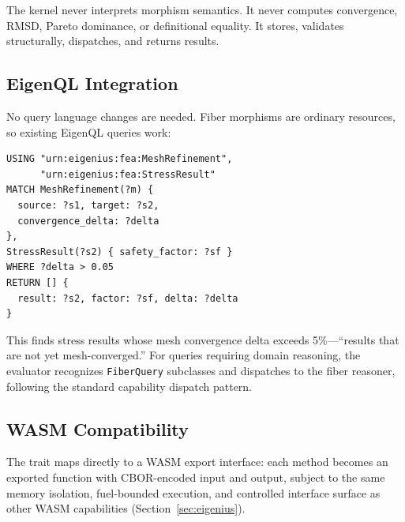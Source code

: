 \documentclass[10pt,twocolumn,letterpaper]{article}
\newcommand{\code}[1]{\texttt{\small #1}}
\begin{document}
The kernel never interprets morphism semantics.
It never computes convergence, RMSD, Pareto dominance, or definitional equality.
It stores, validates structurally, dispatches, and returns results.

\subsection{EigenQL Integration}

No query language changes are needed.
Fiber morphisms are ordinary resources, so existing EigenQL queries work:

{\scriptsize
\begin{verbatim}
USING "urn:eigenius:fea:MeshRefinement",
      "urn:eigenius:fea:StressResult"
MATCH MeshRefinement(?m) {
  source: ?s1, target: ?s2,
  convergence_delta: ?delta
},
StressResult(?s2) { safety_factor: ?sf }
WHERE ?delta > 0.05
RETURN [] {
  result: ?s2, factor: ?sf, delta: ?delta
}
\end{verbatim}
}

\noindent This finds stress results whose mesh convergence delta exceeds 5\%---``results that are not yet mesh-converged.''
For queries requiring domain reasoning, the evaluator recognizes \code{FiberQuery} subclasses and dispatches to the fiber reasoner, following the standard capability dispatch pattern.

\subsection{WASM Compatibility}

The trait maps directly to a WASM export interface: each method becomes an exported function with CBOR-encoded input and output, subject to the same memory isolation, fuel-bounded execution, and controlled interface surface as other WASM capabilities (Section~\ref{sec:eigenius}).

\balance
\end{document}
